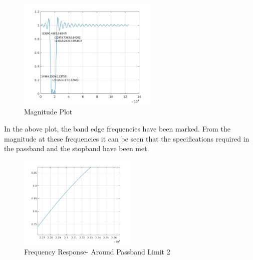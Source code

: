 \documentclass[12pt]{article}
\begin{document}
\newpage
\begin{figure}[h!]
	\centering	
	\includegraphics[width = 0.6\textwidth]{2firb.jpg}
    \caption{Magnitude Plot}
\end{figure}
In the above plot, the band edge frequencies have been marked. From the magnitude at these frequencies it can be seen that the specifications required in the passband and the stopband have been met.
\begin{figure}[h!]
	\centering	
	\includegraphics[width = 0.5\textwidth]{2firpb2.jpg}
    \caption{Frequency Response- Around Passband Limit 2}
\end{figure}
\end{document}
